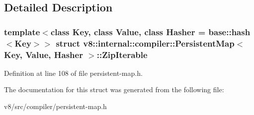 \subsection{Detailed Description}
\subsubsection*{template$<$class Key, class Value, class Hasher = base\+::hash$<$\+Key$>$$>$\newline
struct v8\+::internal\+::compiler\+::\+Persistent\+Map$<$ Key, Value, Hasher $>$\+::\+Zip\+Iterable}



Definition at line 108 of file persistent-\/map.\+h.



The documentation for this struct was generated from the following file\+:\begin{DoxyCompactItemize}
\item 
v8/src/compiler/persistent-\/map.\+h\end{DoxyCompactItemize}

